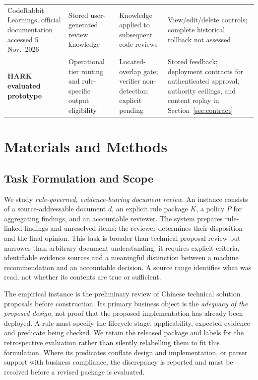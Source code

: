 \documentclass[computers,article,submit,moreauthors]{Definitions/mdpi}
\begin{document}
\begin{table}[!ht]
\begin{tabularx}{\textwidth}{@{}>{\raggedright\arraybackslash}p{2.6cm}>{\raggedright\arraybackslash}X>{\raggedright\arraybackslash}X>{\raggedright\arraybackslash}X@{}}
CodeRabbit Learnings, official documentation accessed 5 Nov.\ 2026~\cite{coderabbitLearnings} & Stored user-generated review knowledge & Knowledge applied to subsequent code reviews & View/edit/delete controls; complete historical rollback not assessed \\
\textbf{HARK evaluated prototype} & Operational tier routing and rule-specific output eligibility & Located-overlap gate; verifier non-detection; explicit pending & Stored feedback; deployment contracts for authenticated approval, authority ceilings, and content replay in Section~\ref{sec:contract} \\
\bottomrule
\end{tabularx}
\end{table}


\section{Materials and Methods}

\subsection{Task Formulation and Scope}\label{sec:problem}

We study \emph{rule-governed, evidence-bearing document review}. An instance consists of a source-addressable document $d$, an explicit rule package $K$, a policy $P$ for aggregating findings, and an accountable reviewer. The system prepares rule-linked findings and unresolved items; the reviewer determines their disposition and the final opinion. This task is broader than technical proposal review but narrower than arbitrary document understanding: it requires explicit criteria, identifiable evidence sources and a meaningful distinction between a machine recommendation and an accountable decision. A source range identifies what was read, not whether its contents are true or sufficient.

The empirical instance is the preliminary review of Chinese technical solution proposals before construction. Its primary business object is the \emph{adequacy of the proposed design}, not proof that the proposed implementation has already been deployed. A rule must specify the lifecycle stage, applicability, expected evidence and predicate being checked. We retain the released package and labels for the retrospective evaluation rather than silently relabelling them to fit this formulation. Where its predicates conflate design and implementation, or parser support with business compliance, the discrepancy is reported and must be resolved before a revised package is evaluated.
\end{document}
